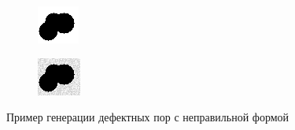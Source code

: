 \documentclass[code]{wordcore}
\begin{document}
\begin{figure}[H]
	\centering
	\begin{subfigure}[t]{0.48\textwidth}
		\includegraphics[width=\textwidth]{fig/defective_clean.png}
	\end{subfigure}
	\hfill
	\begin{subfigure}[t]{0.48\textwidth}
		\includegraphics[width=\textwidth]{fig/defective_noisy.png}
	\end{subfigure}
	\caption{Пример генерации дефектных пор с неправильной формой}
\end{figure}
\end{document}
